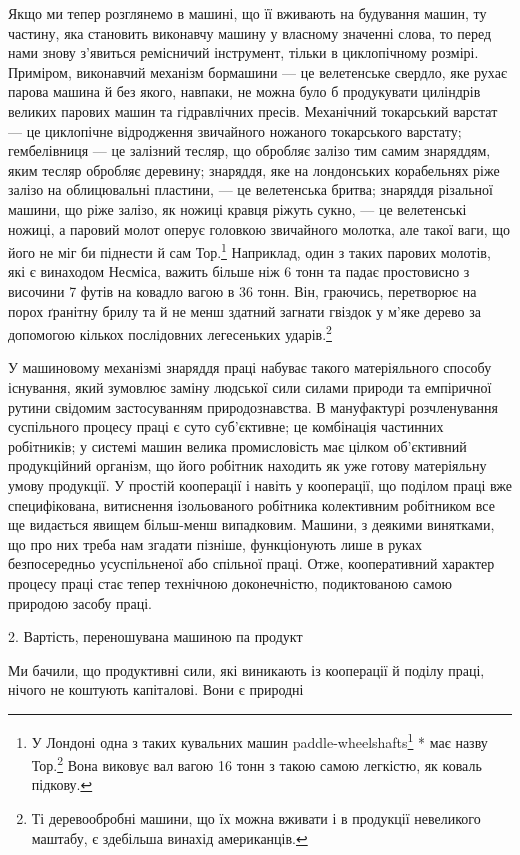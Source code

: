 Якщо ми тепер розглянемо в машині, що її вживають на будування
машин, ту частину, яка становить виконавчу машину у
власному значенні слова, то перед нами знову з’явиться ремісничий
інструмент, тільки в циклопічному розмірі. Приміром, виконавчий
механізм бормашини — це велетенське свердло, яке рухає
парова машина й без якого, навпаки, не можна було б продукувати
циліндрів великих парових машин та гідравлічних пресів.
Механічний токарський варстат — це циклопічне відродження
звичайного ножаного токарського варстату; гембелівниця — це
залізний тесляр, що обробляє залізо тим самим знаряддям, яким
тесляр обробляє деревину; знаряддя, яке на лондонських корабельнях
ріже залізо на облицювальні пластини, — це велетенська
бритва; знаряддя різальної машини, що ріже залізо, як ножиці
кравця ріжуть сукно, — це велетенські ножиці, а паровий молот
оперує головкою звичайного молотка, але такої ваги, що його
не міг би піднести й сам Тор.\footnote{
У Лондоні одна з таких кувальних машин paddle-wheelshafts\footnote*{
— валів до лопатевих коліс. Ред.
} *
має назву Тор.\footnote*{
Ім’я скандінавського бога блискавки, що його уявляли з великим
молотом у руці. Ред.
} Вона виковує вал вагою 16 тонн з такою самою легкістю,
як коваль підкову.
} Наприклад, один з таких парових
молотів, які є винаходом Несміса, важить більше ніж 6 тонн
та падає простовисно з височини 7 футів на ковадло вагою в
36 тонн. Він, граючись, перетворює на порох ґранітну брилу та
й не менш здатний загнати гвіздок у м’яке дерево за допомогою
кількох послідовних легесеньких ударів.\footnote{
Ті деревообробні машини, що їх можна вживати і в продукції
невеликого маштабу, є здебільша винахід американців.
}

У машиновому механізмі знаряддя праці набуває такого матеріяльного
способу існування, який зумовлює заміну людської
сили силами природи та емпіричної рутини свідомим застосуванням
природознавства. В мануфактурі розчленування суспільного
процесу праці є суто суб’єктивне; це комбінація частинних робітників;
у системі машин велика промисловість має цілком об’єктивний
продукційний організм, що його робітник находить як
уже готову матеріяльну умову продукції. У простій кооперації і
навіть у кооперації, що поділом праці вже специфікована, витиснення
ізольованого робітника колективним робітником все ще
видається явищем більш-менш випадковим. Машини, з деякими
винятками, що про них треба нам згадати пізніше, функціонують
лише в руках безпосередньо усуспільненої або спільної праці.
Отже, кооперативний характер процесу праці стає тепер технічною
доконечністю, подиктованою самою природою засобу праці.

2. Вартість, переношувана машиною па продукт

Ми бачили, що продуктивні сили, які виникають із кооперації
й поділу праці, нічого не коштують капіталові. Вони є природні
